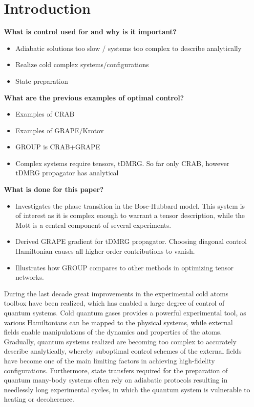 \section{Introduction}

\textbf{What is control used for and why is it important?}
\begin{itemize}
	\item
	Adiabatic solutions too slow / systems too complex to describe analytically

	\item
	Realize cold complex systems/configurations
	
	\item
	State preparation 
\end{itemize}


\textbf{What are the previous examples of optimal control?}
\begin{itemize}
	\item
	Examples of CRAB
	
	\item
	Examples of GRAPE/Krotov
	
	\item
	GROUP is CRAB+GRAPE
	
	\item
	Complex systems require tensors, tDMRG. So far only CRAB, however tDMRG propagator has analytical  
\end{itemize}


\textbf{What is done for this paper?}
\begin{itemize}
	\item
	Investigates the phase transition in the Bose-Hubbard model. This system is of interest as it is complex enough to warrant a tensor description, while the Mott is a central component of several experiments.

	\item
	Derived GRAPE gradient for tDMRG propagator. Choosing diagonal control Hamiltonian causes all higher order contributions to vanish.
	
	\item 
	Illustrates how GROUP compares to other methods in optimizing tensor networks.
\end{itemize}

During the last decade great improvements in the experimental cold atoms toolbox have been realized, which has enabled a large degree of control  of quantum systems. Cold quantum gases provides a powerful experimental tool, as various Hamiltonians can be mapped to the physical systems, while external fields enable manipulations of the dynamics and properties of the atoms. Gradually, quantum systems realized are becoming too complex to accurately describe analytically, whereby suboptimal control schemes of the external fields have become one of the main limiting factors in achieving high-fidelity configurations. Furthermore, state transfers required for the preparation of quantum many-body systems often rely on adiabatic protocols resulting in needlessly long experimental cycles, in which the quantum system is vulnerable to heating or decoherence.

